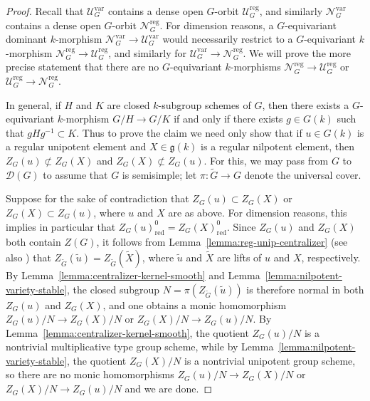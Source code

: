 \documentclass[11pt,reqno]{amsart}
\theoremstyle{definition}
\renewcommand{\rm}{\mathrm}
\newcommand{\sD}{{\mathscr D}}
\newcommand{\sN}{{\mathscr N}}
\newcommand{\sU}{{\mathscr U}}
\newcommand{\fg}{\mathfrak{g}}
\begin{document}
\begin{proof}
    Recall that $\sU_G^{\rm{var}}$ contains a dense open $G$-orbit $\sU_G^{\rm{reg}}$, and similarly $\sN_G^{\rm{var}}$ contains a dense open $G$-orbit $\sN_G^{\rm{reg}}$. For dimension reasons, a $G$-equivariant dominant $k$-morphism $\sN_G^{\rm{var}} \to \sU_G^{\rm{var}}$ would necessarily restrict to a $G$-equivariant $k$-morphism $\sN_G^{\rm{reg}} \to \sU_G^{\rm{reg}}$, and similarly for $\sU_G^{\rm{var}} \to \sN_G^{\rm{reg}}$. We will prove the more precise statement that there are no $G$-equivariant $k$-morphisms $\sN_G^{\rm{reg}} \to \sU_G^{\rm{reg}}$ or $\sU_G^{\rm{reg}} \to \sN_G^{\rm{reg}}$.

    In general, if $H$ and $K$ are closed $k$-subgroup schemes of $G$, then there exists a $G$-equivariant $k$-morphism $G/H \to G/K$ if and only if there exists $g \in G(k)$ such that $gHg^{-1} \subset K$. Thus to prove the claim we need only show that if $u \in G(k)$ is a regular unipotent element and $X \in \fg(k)$ is a regular nilpotent element, then $Z_G(u) \not\subset Z_G(X)$ and $Z_G(X) \not\subset Z_G(u)$. For this, we may pass from $G$ to $\sD(G)$ to assume that $G$ is semisimple; let $\pi\colon \widetilde{G} \to G$ denote the universal cover.

    Suppose for the sake of contradiction that $Z_G(u) \subset Z_G(X)$ or $Z_G(X) \subset Z_G(u)$, where $u$ and $X$ are as above. For dimension reasons, this implies in particular that $Z_G(u)_{\rm{red}}^0 = Z_G(X)_{\rm{red}}^0$. Since $Z_G(u)$ and $Z_G(X)$ both contain $Z(G)$, it follows from Lemma~\ref{lemma:reg-unip-centralizer} (see also \cite[Lemma 3.4]{Integral-Springer}) that $Z_{\widetilde{G}}(\widetilde{u}) = Z_{\widetilde{G}}(\widetilde{X})$, where $\widetilde{u}$ and $\widetilde{X}$ are lifts of $u$ and $X$, respectively. By Lemma~\ref{lemma:centralizer-kernel-smooth} and Lemma~\ref{lemma:nilpotent-variety-stable}, the closed subgroup $N = \pi(Z_{\widetilde{G}}(\widetilde{u}))$ is therefore normal in both $Z_G(u)$ and $Z_G(X)$, and one obtains a monic homomorphism $Z_G(u)/N \to Z_G(X)/N$ or $Z_G(X)/N \to Z_G(u)/N$. By Lemma~\ref{lemma:centralizer-kernel-smooth}, the quotient $Z_G(u)/N$ is a nontrivial multiplicative type group scheme, while by Lemma~\ref{lemma:nilpotent-variety-stable}, the quotient $Z_G(X)/N$ is a nontrivial unipotent group scheme, so there are no monic homomorphisms $Z_G(u)/N \to Z_G(X)/N$ or $Z_G(X)/N \to Z_G(u)/N$ and we are done.
\end{proof}
\end{document}
